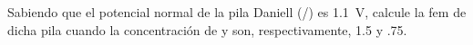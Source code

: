 Sabiendo que el potencial normal de la pila Daniell (/) es \SI{1,1}{\volt}, calcule la fem de dicha pila cuando la concentración de  y  son, respectivamente, \SI{1,5}{\Molar} y \SI{,75}{\Molar}.
